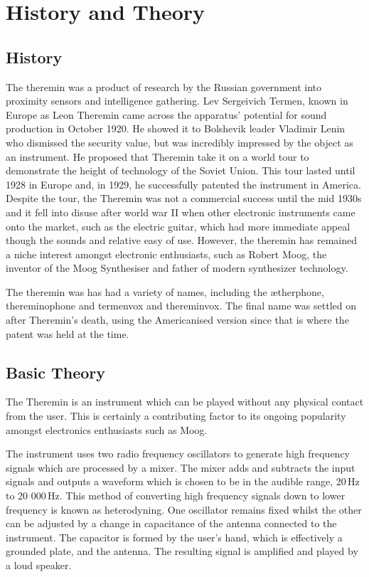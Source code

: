 \setcounter{page}{1}
\section{History and Theory}
\subsection{History}

The theremin was a product of research by the Russian government into proximity sensors and intelligence gathering. Lev Sergeivich Termen, known in Europe as Leon Theremin came across the apparatus' potential for sound production in October 1920. He showed it to Bolshevik leader Vladimir Lenin who dismissed the security value, but was incredibly impressed by the object as an instrument. He proposed that Theremin take it on a world tour to demonstrate the height of technology of the Soviet Union. This tour lasted until 1928 in Europe and, in 1929, he successfully patented the instrument in America. Despite the tour, the Theremin was not a commercial success until the mid 1930s and it fell into disuse after world war II when other electronic instruments came onto the market, such as the electric guitar, which had more immediate appeal though the sounds and relative easy of use. However, the theremin has remained a niche interest amongst electronic enthusiasts, such as Robert Moog, the inventor of the Moog Synthesiser and father of modern synthesizer technology.

The theremin was has had a variety of names, including the \ae therphone, thereminophone and termenvox and thereminvox. The final name was settled on after Theremin's death, using the Americanised version since that is where the patent was held at the time.

\subsection{Basic Theory}

The Theremin is an instrument which can be played without any physical contact from the user. This is certainly a contributing factor to its ongoing popularity amongst electronics enthusiasts such as Moog. 

The instrument uses two radio frequency oscillators to generate high frequency signals which are processed by a mixer. The mixer adds and subtracts the input signals and outputs a waveform which is chosen to be in the audible range, 20\,Hz to 20 000\,Hz. This method of converting high frequency signals down to lower frequency is known as heterodyning. One oscillator remains fixed whilst the other can be adjusted by a change in capacitance of the antenna connected to the instrument. The capacitor is formed by the user's hand, which is effectively a grounded plate, and the antenna. The resulting signal is amplified and played by a loud speaker.

